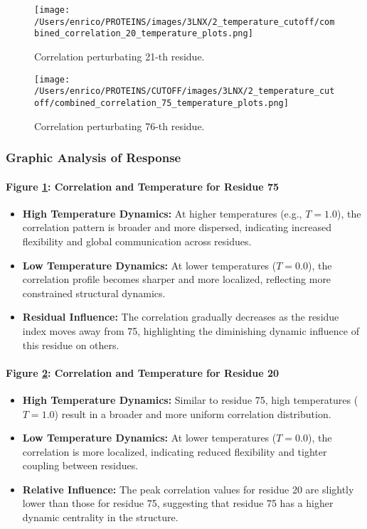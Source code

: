 \documentclass[English, Lau, oneside]{sapthesis}
\begin{document}
\begin{figure}[h!]
    \centering
    \texttt{[image: /Users/enrico/PROTEINS/images/3LNX/2\_temperature\_cutoff/combined\_correlation\_20\_temperature\_plots.png]}
    \caption{Correlation perturbating 21-th residue.}
    \label{fig:corr21_out}
\end{figure}
\begin{figure}[h!]
    \centering
    \texttt{[image: /Users/enrico/PROTEINS/CUTOFF/images/3LNX/2\_temperature\_cutoff/combined\_correlation\_75\_temperature\_plots.png]}
    \caption{Correlation perturbating 76-th residue.}
    \label{fig:corr76_out}
\end{figure}
\subsubsection{Graphic Analysis of Response}

\paragraph{Figure \ref{fig:corr21_out}: Correlation and Temperature for Residue 75}
\begin{itemize}
    \item \textbf{High Temperature Dynamics:} At higher temperatures (e.g., \( T = 1.0 \)), the correlation pattern is broader and more dispersed, indicating increased flexibility and global communication across residues.
    \item \textbf{Low Temperature Dynamics:} At lower temperatures (\( T = 0.0 \)), the correlation profile becomes sharper and more localized, reflecting more constrained structural dynamics.
    \item \textbf{Residual Influence:} The correlation gradually decreases as the residue index moves away from 75, highlighting the diminishing dynamic influence of this residue on others.
\end{itemize}

\paragraph{Figure \ref{fig:corr76_out}: Correlation and Temperature for Residue 20}
\begin{itemize}
    \item \textbf{High Temperature Dynamics:} Similar to residue 75, high temperatures (\( T = 1.0 \)) result in a broader and more uniform correlation distribution.
    \item \textbf{Low Temperature Dynamics:} At lower temperatures (\( T = 0.0 \)), the correlation is more localized, indicating reduced flexibility and tighter coupling between residues.
    \item \textbf{Relative Influence:} The peak correlation values for residue 20 are slightly lower than those for residue 75, suggesting that residue 75 has a higher dynamic centrality in the structure.
\end{itemize}
\end{document}
